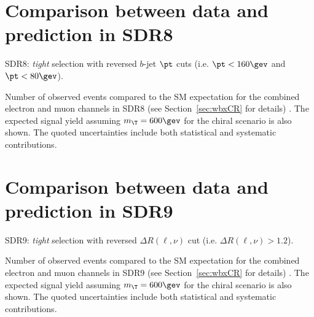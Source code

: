 \clearpage

%


\clearpage

\section{Comparison between data and prediction in SDR8}
\label{sec:DataMC_CR8}

SDR8: {\sl tight} selection with reversed $b$-jet $\pt$ cuts (i.e. $\pt < 160\gev$ and $\pt < 80\gev$).

\begin{table}[h!]
\begin{center}

\caption{\small{Number of observed events compared to the SM expectation for
the combined electron and muon channels in SDR8 (see Section~\ref{sec:wbxCR} for details) . 
The expected signal yield assuming $m_{\T}=600\gev$ for the chiral scenario is also shown. 
The quoted uncertainties include both statistical and systematic contributions.}}
\label{tab:CR8_1W_evtable}
\end{center}
\end{table}

\clearpage

%


\clearpage

\section{Comparison between data and prediction in SDR9}
\label{sec:DataMC_CR9}

SDR9: {\sl tight} selection with reversed $\Delta R(\ell,\nu)$ cut (i.e. $\Delta R(\ell,\nu)>1.2$).

\begin{table}[h!]
\begin{center}

\caption{\small{Number of observed events compared to the SM expectation for
the combined electron and muon channels in SDR9 (see Section~\ref{sec:wbxCR} for details) . 
The expected signal yield assuming $m_{\T}=600\gev$ for the chiral scenario is also shown. 
The quoted uncertainties include both statistical and systematic contributions.}}
\label{tab:CR9_1W_evtable}
\end{center}
\end{table}

\clearpage

%

